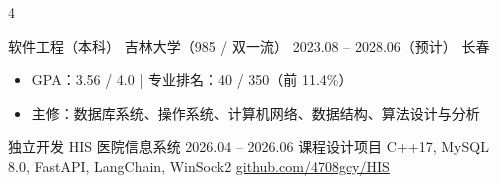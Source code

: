\documentclass[10pt,a4paper,ragged2e]{maltacv}
\begin{document}


\bio{}

\makecvheader

\medskip

\begin{center}
  \begin{multicols}{4}
  \end{multicols}
\end{center}

\medskip

\cvuniversity
{软件工程（本科）}
{吉林大学（985 / 双一流）}
{2023.08 -- 2028.06（预计）}
{长春}

\begin{itemize}
  \item GPA：3.56 / 4.0 \quad | \quad 专业排名：40 / 350（前 11.4\%）
  \item 主修：数据库系统、操作系统、计算机网络、数据结构、算法设计与分析
\end{itemize}

\medskip

\cvexperience
{独立开发}
{HIS 医院信息系统}
{2026.04 -- 2026.06}
{课程设计项目}
{C++17, MySQL 8.0, FastAPI, LangChain, WinSock2 \quad \href{https://github.com/4708gcy/HIS}{github.com/4708gcy/HIS}}
\end{document}
